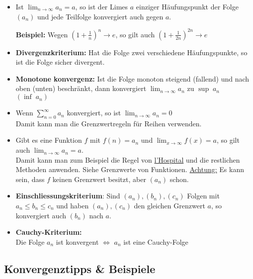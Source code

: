 \begin{itemize}[leftmargin=*]	
	\item Ist $\lim_{n \to \infty} a_n = a$, so ist der Limes $a$ einziger
	Häufungspunkt der Folge $(a_n)$ und jede Teilfolge konvergiert auch gegen $a$.
	
	\textbf{Beispiel:} Wegen $\left( 1 + \frac{1}{n} \right)^n \to e$, so gilt auch
	$\left( 1 + \frac{1}{2n} \right)^{2n} \to e$
	
	\item \textbf{Divergenzkriterium:} Hat die Folge zwei verschiedene Häufungspunkte, so ist die Folge sicher
	divergent.
	
	\item \textbf{Monotone konvergenz:} Ist die Folge monoton steigend (fallend) und nach oben (unten) beschränkt, dann konvergiert $\lim_{n \to \infty} a_n$ zu $\sup \; a_n$ $(\inf \; a_n)$
	
	\item Wenn $\sum_{n=0}^\infty a_n$ konvergiert, so ist $\lim_{n \to \infty} a_n = 0$\\
	Damit kann man die Grenzwertregeln für Reihen verwenden.
	
	\item Gibt es eine Funktion $f$ mit $f(n) = a_n$ und $\lim_{x \to \infty} f(x)
	= a$, so gilt auch $\lim_{n \to \infty} a_n = a$.\\
	Damit kann man zum Beispiel die Regel von \underline{l'Hospital} und die
	restlichen Methoden anwenden. Siehe Grenzwerte von Funktionen.
	\underline{Achtung:} Es kann sein, dass $f$ keinen Grenzwert besitzt, aber
	$(a_n)$ schon.
	
	\item \textbf{Einschliessungskriterium}: Sind $(a_n), (b_n), (c_n)$ Folgen mit
	$a_n \leq b_n \leq c_n$ und haben $(a_n), (c_n)$ den gleichen Grenzwert $a$, so
	konvergiert auch $(b_n)$ nach $a$.

	\item \textbf{Cauchy-Kriterium:} \\
	Die Folge $a_n$ ist konvergent $\Leftrightarrow$ $a_n$ ist eine Cauchy-Folge 
\end{itemize}

\subsection{Konvergenztipps \& Beispiele}
